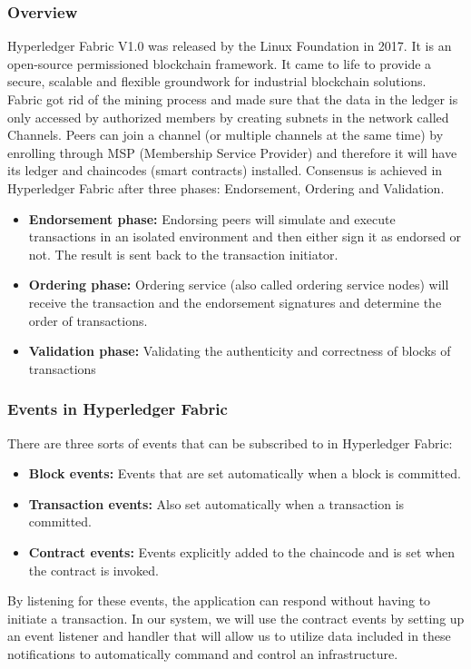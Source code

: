 \documentclass[conference]{IEEEtran}
\begin{document}
\subsubsection{Overview}
Hyperledger Fabric V1.0 was released by the Linux Foundation in 2017. It is an open-source permissioned blockchain framework. It came to life to provide a secure, scalable and flexible groundwork for industrial blockchain solutions. Fabric got rid of the mining process and made sure that the data in the ledger is only accessed by authorized members by creating subnets in the network called Channels. Peers can join a channel (or multiple channels at the same time) by enrolling through MSP (Membership Service Provider) and therefore it will have its ledger and chaincodes (smart contracts) installed.
Consensus is achieved in Hyperledger Fabric after three phases: Endorsement, Ordering and Validation.
 \begin{itemize}
     \item \textbf{Endorsement phase:} Endorsing peers will simulate and execute transactions in an isolated environment and then either sign it as endorsed or not. The result is sent back to the transaction initiator.
     \item \textbf{Ordering phase:} Ordering service (also called ordering service nodes) will receive the transaction and the endorsement signatures and determine the order of transactions.
     \item \textbf{Validation phase:} Validating the authenticity and correctness of blocks of transactions
   \end{itemize}

\subsubsection{Events in Hyperledger Fabric}
There are three sorts of events that can be subscribed to in Hyperledger Fabric:
 \begin{itemize}
     \item \textbf{Block events:} Events that are set automatically when a block is committed.
     \item \textbf{Transaction events:} Also set automatically when a transaction is committed.
     \item \textbf{Contract events:} Events explicitly added to the chaincode and is set when the contract is invoked.
   \end{itemize}
By listening for these events, the application can respond without having to initiate a transaction.
In our system, we will use the contract events by setting up an event listener and handler that will
allow us to utilize data included in these notifications to automatically command and control an infrastructure.
\end{document}
